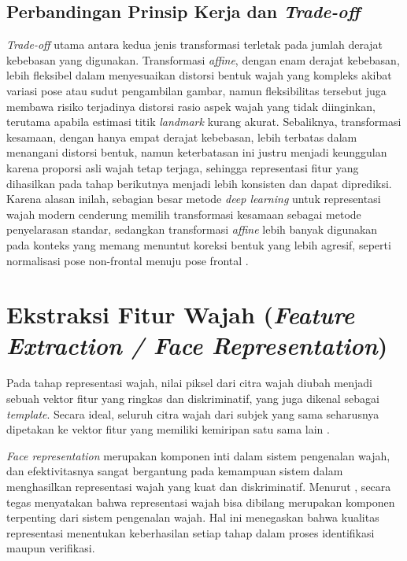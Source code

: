 \subsection{Perbandingan Prinsip Kerja dan \textit{Trade-off}}

\textit{Trade-off} utama antara kedua jenis transformasi terletak pada jumlah derajat kebebasan yang digunakan. Transformasi \textit{affine}, dengan enam derajat kebebasan, lebih fleksibel dalam menyesuaikan distorsi bentuk wajah yang kompleks akibat variasi pose atau sudut pengambilan gambar, namun fleksibilitas tersebut juga membawa risiko terjadinya distorsi rasio aspek wajah yang tidak diinginkan, terutama apabila estimasi titik \textit{landmark} kurang akurat. Sebaliknya, transformasi kesamaan, dengan hanya empat derajat kebebasan, lebih terbatas dalam menangani distorsi bentuk, namun keterbatasan ini justru menjadi keunggulan karena proporsi asli wajah tetap terjaga, sehingga representasi fitur yang dihasilkan pada tahap berikutnya menjadi lebih konsisten dan dapat diprediksi. Karena alasan inilah, sebagian besar metode \textit{deep learning} untuk representasi wajah modern cenderung memilih transformasi kesamaan sebagai metode penyelarasan standar, sedangkan transformasi \textit{affine} lebih banyak digunakan pada konteks yang memang menuntut koreksi bentuk yang lebih agresif, seperti normalisasi pose non-frontal menuju pose frontal \autocite{wang2021deep}.

\section{Ekstraksi Fitur Wajah (\textit{Feature Extraction / Face Representation})}

Pada tahap representasi wajah, nilai piksel dari citra wajah diubah menjadi sebuah vektor fitur yang ringkas dan diskriminatif, yang juga dikenal sebagai \textit{template}. Secara ideal, seluruh citra wajah dari subjek yang sama seharusnya dipetakan ke vektor fitur yang memiliki kemiripan satu sama lain \autocite{Trigueros2018}.

\textit{Face representation} merupakan komponen inti dalam sistem pengenalan wajah, dan efektivitasnya sangat bergantung pada kemampuan sistem dalam menghasilkan representasi wajah yang kuat dan diskriminatif. Menurut \textcite{Trigueros2018}, secara tegas menyatakan bahwa representasi wajah bisa dibilang merupakan komponen terpenting dari sistem pengenalan wajah. Hal ini menegaskan bahwa kualitas representasi menentukan keberhasilan setiap tahap dalam proses identifikasi maupun verifikasi.

